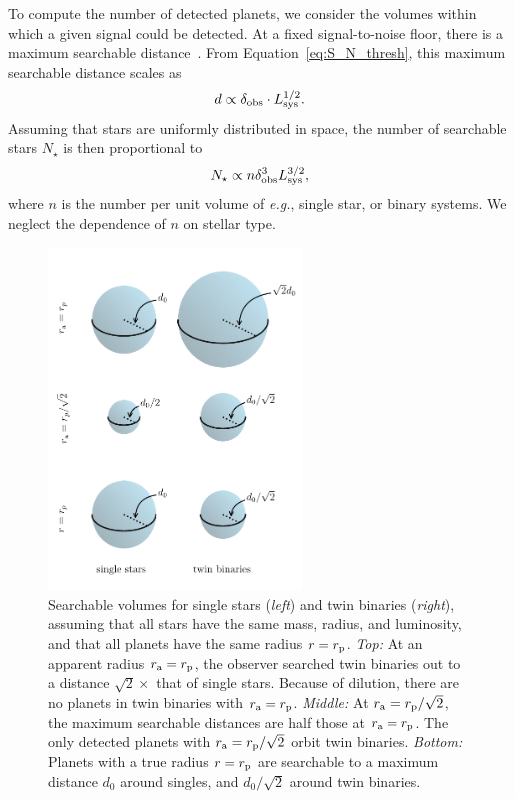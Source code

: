 \documentclass[12pt,modern]{aastex61}
\renewcommand{\a}{_{\rm a}}
\newcommand{\p}{_{\rm p}}
\begin{document}
To compute the number of detected planets, we consider the volumes within 
which a given signal could be detected. At a fixed signal-to-noise floor, 
there is a maximum searchable 
distance~\citep{pepper_using_2003,pepper_searching_2005}.
From Equation~\ref{eq:S_N_thresh}, this maximum searchable distance scales as
\begin{equation}
d \propto \delta_{\rm obs} \cdot L_{\rm 
    sys}^{1/2}.
\end{equation}
Assuming that stars are uniformly distributed in space, the number 
of searchable stars $N_\star$ is then proportional to
\begin{equation}
N_\star \propto n \delta_{\rm obs}^3 L_{\rm 
    sys}^{3/2},
\label{eq:N_searchable_prop}
\end{equation}
where $n$ is the number per unit volume of {\it e.g.}, single star, or binary 
systems.
We neglect the dependence of $n$ on stellar type.


\begin{figure}[!tb]
    \begin{center}
        \includegraphics[width=0.6\textwidth]{figures/visualize_volumes.pdf}
    \end{center}
    \caption{
        Searchable volumes for single stars ({\it left}) and 
        twin binaries ({\it right}), assuming that all stars have the 
        same mass, radius, and luminosity, and that all planets have the same 
        radius $r=r\p$.
        {\it Top:} At an apparent radius $r\a=r\p$,
        the observer searched twin binaries out to a
        distance $\sqrt{2}\times$ that of single stars.
        Because of dilution, there are no planets in twin binaries with 
        $r\a=r\p$.
        {\it Middle:} At $r\a=r\p/\sqrt{2}$, the 
        maximum searchable distances are half those at $r\a=r\p$. 
        The only detected planets with $r\a=r\p/\sqrt{2}$ orbit twin binaries.
        {\it Bottom:} Planets with a true radius $r=r\p$ are searchable to 
        a maximum distance $d_0$ around singles, and $d_0/\sqrt{2}$ around 
        twin binaries.
    }
    \label{fig:model_1_volumes}
\end{figure}
\end{document}
